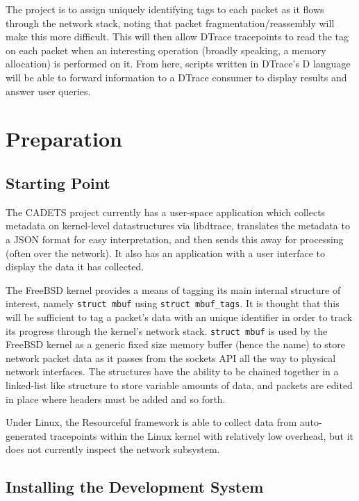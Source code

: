 \documentclass[a4paper,12pt,twoside,openright]{report}
\begin{document}
	The project is to assign uniquely identifying tags to each packet as it flows through the network stack, noting that packet fragmentation/reassembly will make this more difficult. This will then allow DTrace tracepoints to read the tag on each packet when an interesting operation (broadly speaking, a memory allocation) is performed on it. From here, scripts written in DTrace's D language will be able to forward information to a DTrace consumer to display results and answer user queries.

	
	
	\chapter{Preparation}
	
	\section{Starting Point}
	\label{sec:starting-point}
	
	The CADETS project currently has a user-space application which collects metadata on kernel-level	datastructures via libdtrace, translates the metadata to a JSON format for easy interpretation, and	then sends this away for processing (often over the network). It also has an application with a user interface to display the data it has collected.
	
	The FreeBSD kernel provides a means of tagging its main internal structure of interest, namely \verb|struct mbuf| using \verb|struct mbuf_tags|. It is thought that this will be sufficient to tag a packet’s data with an unique identifier in order to track its progress through the kernel’s network stack. \verb|struct mbuf| is used by the FreeBSD kernel as a generic fixed size memory buffer (hence the name) to store network packet data as it passes from the sockets API all the way to physical network interfaces. The structures have the ability to be chained together in a linked-list like structure to store variable amounts of data, and packets are edited in place where headers must be added and so forth.
	
	Under Linux, the Resourceful framework is able to collect data from auto-generated tracepoints	within the Linux kernel with relatively low overhead, but it does not currently inspect the network subsystem.
	
	\section{Installing the Development System}
	
\end{document}
